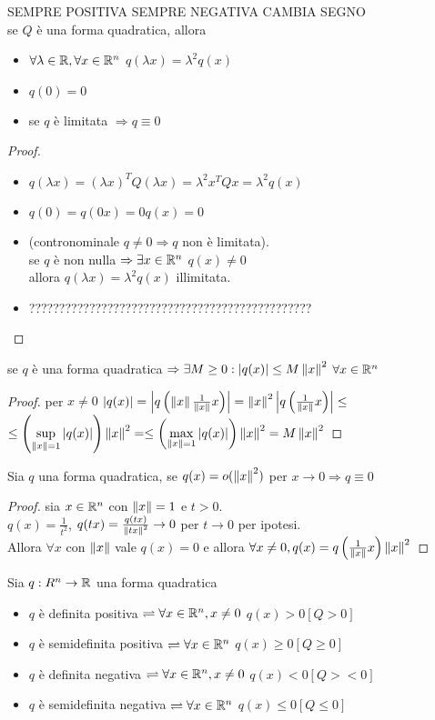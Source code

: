 SEMPRE POSITIVA SEMPRE NEGATIVA CAMBIA SEGNO\\
\proposition
se $Q$ è una forma quadratica, allora\\
\begin{itemize}
	\item $\forall\lambda\in \mathbb{R}, \forall x\in \mathbb{R}^n$ $q(\lambda x)=\lambda^2q(x)$
	\item $q(0)=0$
	\item se $q$ è limitata $\Rightarrow q\equiv 0$ 
\end{itemize}
\begin{proof}
	\begin{itemize}
		\item $q(\lambda x)=(\lambda x)^TQ(\lambda x)=\lambda^2x^TQx=\lambda^2q(x)$
		\item $q(0)=q(0x)=0q(x)=0$
		\item (contronominale $q\ne 0 \Rightarrow q$ non è limitata).\\
		se $q$ è non nulla $\Rightarrow \exists x \in \mathbb{R}^n$ $q(x)\ne 0$\\
		allora $q(\lambda x)=\lambda^2q(x)$ illimitata.
		\item ???????????????????????????????????????????????
	\end{itemize}
\end{proof}
\proposition
se $q$ è una forma quadratica $\Rightarrow\exists M\ge 0: \left|q(x)\right|\le M\left\|x\right\|^2$ $\forall x\in \mathbb{R}^n$
\begin{proof}
	per $x\ne 0$ $\left|q(x)\right| =\left|q\left(\left\|x\right\| \frac{1}{\left\|x\right\| }x\right)\right| = \left\|x\right\|^2\left|q\left(\frac{1}{\left\|x\right\|}x\right)\right|\le$\\
	$\le\left(\sup\limits_{\left\|x\right\|=1}\left|q(x)\right|\right)\left\|x\right\|^2=\le\left(\max\limits_{\left\|x\right\|=1}\left|q(x)\right|\right)\left\|x\right\|^2=M\left\|x\right\|^2$
\end{proof}
\proposition
Sia $q$ una forma quadratica, se $q(x)=o(\left\|x\right\|^2)$ per $x\rightarrow 0 \Rightarrow q\equiv 0$
\begin{proof}
	sia $x\in \mathbb{R}^n$ con $\left\|x\right\|=1$ e $t>0$.\\
	$q(x)=\frac{1}{t^2}$, $q(tx)=\frac{q(tx)}{\left\|tx\right\|^2}\rightarrow 0$ per $t\rightarrow 0$ per ipotesi.\\
	Allora $\forall x$ con $\left\|x\right\|$ vale $q(x)=0$ e allora $\forall x\ne 0, q(x)=q\left(\frac{1}{\left\|x\right\|}x\right)\left\|x\right\|^2$
\end{proof}
Sia $q:R^n\rightarrow \mathbb{R}$ una forma quadratica\\
\begin{itemize}
	\item $q$ è definita positiva $\rightleftharpoons \forall x\in \mathbb{R}^n, x\ne 0$ $q(x)>0 [Q>0]$
	\item $q$ è semidefinita positiva $\rightleftharpoons \forall x\in \mathbb{R}^n$ $q(x)\ge0 [Q\ge0]$
	\item $q$ è definita negativa $\rightleftharpoons \forall x\in \mathbb{R}^n, x\ne 0$ $q(x)<0 [Q><0]$
	\item $q$ è semidefinita negativa $\rightleftharpoons \forall x\in \mathbb{R}^n$ $q(x)\le0 [Q\le0]$
\end{itemize}
